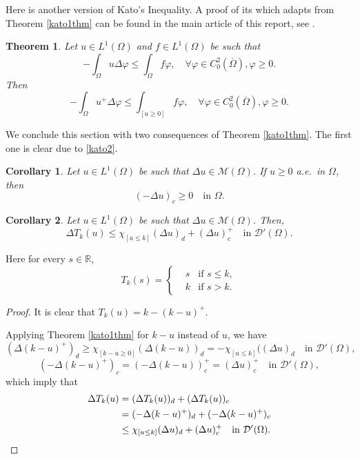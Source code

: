 \documentclass[a4paper, 11pt]{report}
\newtheorem{thm}{Theorem}[chapter]
\newtheorem{crr}{Corollary}[chapter]
\theoremstyle{definition}\newtheorem*{rmk}{Remark}
\begin{document}
Here is another version of Kato's Inequality. A proof of its which adapts from Theorem \ref{kato1thm} can be found in the main article of this report, see \cite[Proposition B.5]{BMP}.

\begin{thm}\label{kato2thm}
Let $u\in L^1(\Omega)$ and $f\in L^1(\Omega)$ be such that
\[
-\int_{\Omega}u\Delta \varphi \le \int_{\Omega} f \varphi, \quad \forall \varphi \in C^2_0(\overline{\Omega}),\varphi\ge 0.
\]
Then
\[
-\int_{\Omega}u^+\Delta \varphi \le \int_{[u\ge 0]} f \varphi, \quad \forall \varphi \in C^2_0(\overline{\Omega}),\varphi\ge 0.
\]
\end{thm}

We conclude this section with two consequences of Theorem \ref{kato1thm}. The first one is clear due to \eqref{kato2}.

\begin{crr}\label{katocrr1}
Let $u \in L^1(\Omega)$ be such that $\Delta u \in \mathcal{M}(\Omega)$. If $u\ge 0$ a.e.\ in $\Omega$, then
\[
(-\Delta u)_c \ge 0 \quad\text{in }\Omega.
\]
\end{crr}

\begin{crr}\label{katocrr2}
Let $u \in L^1(\Omega)$ be such that $\Delta u \in \mathcal{M}(\Omega)$. Then,
\[
\Delta T_k(u) \le \chi_{[u\le k]}(\Delta u)_d + (\Delta u)^+_c \quad \text{in }\mathcal{D}'(\Omega).
\]
\end{crr}

Here for every $s\in \mathbb{R}$,
\[
T_k(s) = \left\{
\begin{aligned}
&s & \text{if }s\leq k,\\
&k & \text{if }s > k.
\end{aligned}
\right.
\]

\begin{proof}
\mbox{}

It is clear that $T_k(u) = k - (k - u)^+$.

Applying Theorem \ref{kato1thm} for $k-u$ instead of $u$, we have
\[
(\Delta (k-u)^+)_d \ge \chi_{[k-u\ge 0]} (\Delta (k-u))_d = -\chi_{[u\le k]}( (\Delta u)_d \quad\text{in } \mathcal{D}'(\Omega),
\]
\[
(-\Delta (k-u)^+)_c = (-\Delta(k-u))_c^+ = (\Delta u)_c^+ \quad \text{in }\mathcal{D}'(\Omega),
\]
which imply that
\begin{align*}
\Delta T_k(u) &= (\Delta T_k(u))_d + (\Delta T_k(u))_c\\
&=(-\Delta (k-u)^+)_d + (-\Delta (k-u)^+)_c \\
&\le \chi_{[u\le k]}(\Delta u)_d + (\Delta u)_c^+\quad \text{in }\mathcal{D}'(\Omega).\qedhere
\end{align*}
\end{proof}
\end{document}
